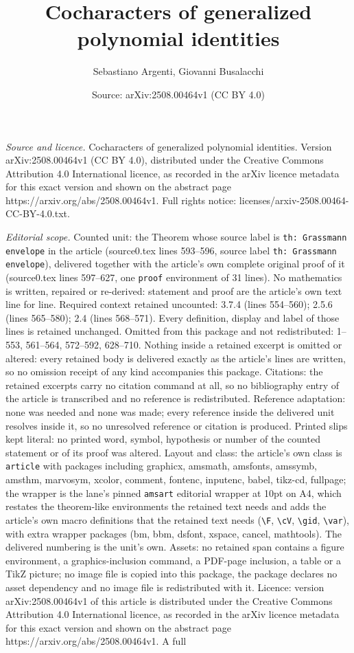 \documentclass[10pt,a4paper]{amsart}
\title[Cocharacters of generalized polynomial identities]{Cocharacters of generalized polynomial identities}
\author{Sebastiano Argenti, Giovanni Busalacchi}
\date{Source: arXiv:2508.00464v1 (CC BY 4.0)}
\begin{document}
\maketitle

\noindent\emph{Source and licence.} Cocharacters of generalized polynomial identities. Version arXiv:2508.00464v1 (CC BY 4.0), distributed under the Creative Commons Attribution 4.0 International licence, as recorded in the arXiv licence metadata for this exact version and shown on the abstract page https://arxiv.org/abs/2508.00464v1. Full rights notice: licenses/arxiv-2508.00464-CC-BY-4.0.txt.\par\smallskip

\noindent\textit{Editorial scope.} Counted unit: the Theorem whose source label is \texttt{th: Grassmann envelope} in the article (source0.tex lines 593--596, source label \texttt{th: Grassmann envelope}), delivered together with the article's own complete original proof of it (source0.tex lines 597--627, one \texttt{proof} environment of 31 lines). No mathematics is written, repaired or re-derived: statement and proof are the article's own text line for line. Required context retained uncounted: 3.7.4 (lines 554--560); 2.5.6 (lines 565--580); 2.4 (lines 568--571). Every definition, display and label of those lines is retained unchanged. Omitted from this package and not redistributed: 1--553, 561--564, 572--592, 628--710. Nothing inside a retained excerpt is omitted or altered: every retained body is delivered exactly as the article's lines are written, so no omission receipt of any kind accompanies this package. Citations: the retained excerpts carry no citation command at all, so no bibliography entry of the article is transcribed and no reference is redistributed. Reference adaptation: none was needed and none was made; every reference inside the delivered unit resolves inside it, so no unresolved reference or citation is produced. Printed slips kept literal: no printed word, symbol, hypothesis or number of the counted statement or of its proof was altered. Layout and class: the article's own class is \texttt{article} with packages including graphicx, amsmath, amsfonts, amssymb, amsthm, marvosym, xcolor, comment, fontenc, inputenc, babel, tikz-cd, fullpage; the wrapper is the lane's pinned \texttt{amsart} editorial wrapper at 10pt on A4, which restates the theorem-like environments the retained text needs and adds the article's own macro definitions that the retained text needs (\texttt{\textbackslash F}, \texttt{\textbackslash cV}, \texttt{\textbackslash gid}, \texttt{\textbackslash var}), with extra wrapper packages (bm, bbm, dsfont, xspace, cancel, mathtools). The delivered numbering is the unit's own. Assets: no retained span contains a figure environment, a graphics-inclusion command, a PDF-page inclusion, a table or a TikZ picture; no image file is copied into this package, the package declares no asset dependency and no image file is redistributed with it. Licence: version arXiv:2508.00464v1 of this article is distributed under the Creative Commons Attribution 4.0 International licence, as recorded in the arXiv licence metadata for this exact version and shown on the abstract page https://arxiv.org/abs/2508.00464v1. A full 
\end{document}
